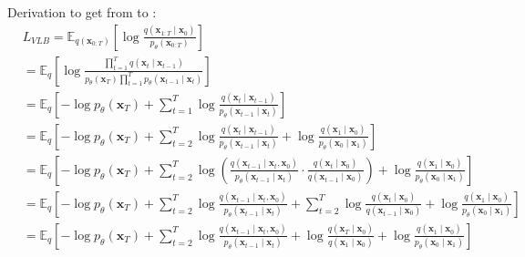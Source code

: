 Derivation to get from  to :
\begingroup
\small
\begin{subequations}
	\label{eqn:vlb3_appendix}
	\begin{align}
	& L_{VLB}=\mathbb{E}_{q\left(\mathbf{x}_{0: T}\right)}\left[\log \frac{q\left(\mathbf{x}_{1: T} \mid \mathbf{x}_0\right)}{p_\theta\left(\mathbf{x}_{0: T}\right)}\right] \\
	& =\mathbb{E}_q\left[\log \frac{\prod_{t=1}^T q\left(\mathbf{x}_t \mid \mathbf{x}_{t-1}\right)}{p_\theta\left(\mathbf{x}_T\right) \prod_{t=1}^T p_\theta\left(\mathbf{x}_{t-1} \mid \mathbf{x}_t\right)}\right] \\
	& =\mathbb{E}_q\left[-\log p_\theta\left(\mathbf{x}_T\right)+\sum_{t=1}^T \log \frac{q\left(\mathbf{x}_t \mid \mathbf{x}_{t-1}\right)}{p_\theta\left(\mathbf{x}_{t-1} \mid \mathbf{x}_t\right)}\right] \\
	& =\mathbb{E}_q\left[-\log p_\theta\left(\mathbf{x}_T\right)+\sum_{t=2}^T \log \frac{q\left(\mathbf{x}_t \mid \mathbf{x}_{t-1}\right)}{p_\theta\left(\mathbf{x}_{t-1} \mid \mathbf{x}_t\right)}+\log \frac{q\left(\mathbf{x}_1 \mid \mathbf{x}_0\right)}{p_\theta\left(\mathbf{x}_0 \mid \mathbf{x}_1\right)}\right] \\
	& =\mathbb{E}_q\left[-\log p_\theta\left(\mathbf{x}_T\right)+\sum_{t=2}^T \log \left(\frac{q\left(\mathbf{x}_{t-1} \mid \mathbf{x}_t, \mathbf{x}_0\right)}{p_\theta\left(\mathbf{x}_{t-1} \mid \mathbf{x}_t\right)} \cdot \frac{q\left(\mathbf{x}_t \mid \mathbf{x}_0\right)}{q\left(\mathbf{x}_{t-1} \mid \mathbf{x}_0\right)}\right)+\log \frac{q\left(\mathbf{x}_1 \mid \mathbf{x}_0\right)}{p_\theta\left(\mathbf{x}_0 \mid \mathbf{x}_1\right)}\right] \\
	& =\mathbb{E}_q\left[-\log p_\theta\left(\mathbf{x}_T\right)+\sum_{t=2}^T \log \frac{q\left(\mathbf{x}_{t-1} \mid \mathbf{x}_t, \mathbf{x}_0\right)}{p_\theta\left(\mathbf{x}_{t-1} \mid \mathbf{x}_t\right)}+\sum_{t=2}^T \log \frac{q\left(\mathbf{x}_t \mid \mathbf{x}_0\right)}{q\left(\mathbf{x}_{t-1} \mid \mathbf{x}_0\right)}+\log \frac{q\left(\mathbf{x}_1 \mid \mathbf{x}_0\right)}{p_\theta\left(\mathbf{x}_0 \mid \mathbf{x}_1\right)}\right] \\
	& =\mathbb{E}_q\left[-\log p_\theta\left(\mathbf{x}_T\right)+\sum_{t=2}^T \log \frac{q\left(\mathbf{x}_{t-1} \mid \mathbf{x}_t, \mathbf{x}_0\right)}{p_\theta\left(\mathbf{x}_{t-1} \mid \mathbf{x}_t\right)}+\log \frac{q\left(\mathbf{x}_T \mid \mathbf{x}_0\right)}{q\left(\mathbf{x}_1 \mid \mathbf{x}_0\right)}+\log \frac{q\left(\mathbf{x}_1 \mid \mathbf{x}_0\right)}{p_\theta\left(\mathbf{x}_0 \mid \mathbf{x}_1\right)}\right] \\

\end{align}
\end{subequations}
